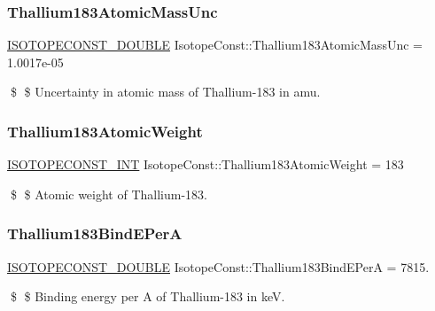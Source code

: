 \subsubsection{\texorpdfstring{Thallium183\+Atomic\+Mass\+Unc}{Thallium183AtomicMassUnc}}
{\footnotesize\ttfamily \mbox{\hyperlink{group___isotope_const-_macros_ga8f45a7272ce02c0b4c65c44636ed719a}{I\+S\+O\+T\+O\+P\+E\+C\+O\+N\+S\+T\+\_\+\+D\+O\+U\+B\+LE}} Isotope\+Const\+::\+Thallium183\+Atomic\+Mass\+Unc = 1.\+0017e-\/05}

\$ \$ Uncertainty in atomic mass of Thallium-\/183 in amu. \mbox{\label{group___isotope_const-_thallium-_tl183_gae2ad8b053bac7d4bcfdf4e5eb76abb7f}} 
\subsubsection{\texorpdfstring{Thallium183\+Atomic\+Weight}{Thallium183AtomicWeight}}
{\footnotesize\ttfamily \mbox{\hyperlink{group___isotope_const-_macros_ga5f18360b3e99483a35c32d789e62621c}{I\+S\+O\+T\+O\+P\+E\+C\+O\+N\+S\+T\+\_\+\+I\+NT}} Isotope\+Const\+::\+Thallium183\+Atomic\+Weight = 183}

\$ \$ Atomic weight of Thallium-\/183. \mbox{\label{group___isotope_const-_thallium-_tl183_gaa9c9160a129b1f344aee579a816af1fc}} 
\subsubsection{\texorpdfstring{Thallium183\+Bind\+E\+PerA}{Thallium183BindEPerA}}
{\footnotesize\ttfamily \mbox{\hyperlink{group___isotope_const-_macros_ga8f45a7272ce02c0b4c65c44636ed719a}{I\+S\+O\+T\+O\+P\+E\+C\+O\+N\+S\+T\+\_\+\+D\+O\+U\+B\+LE}} Isotope\+Const\+::\+Thallium183\+Bind\+E\+PerA = 7815.}

\$ \$ Binding energy per A of Thallium-\/183 in keV. \mbox{\label{group___isotope_const-_thallium-_tl183_gaf2388e2233eb084b10ea82a4f4d63061}} 
